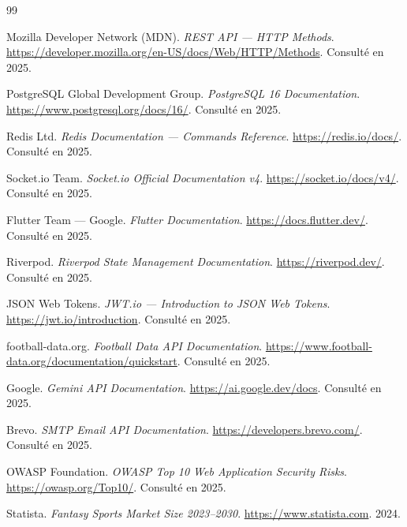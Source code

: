 \begingroup
\makeatletter
\def\chapter*#1{} %
\makeatother
\begin{thebibliography}{99}


Mozilla Developer Network (MDN). \textit{REST API — HTTP Methods}. \url{https://developer.mozilla.org/en-US/docs/Web/HTTP/Methods}. Consulté en 2025.

PostgreSQL Global Development Group. \textit{PostgreSQL 16 Documentation}. \url{https://www.postgresql.org/docs/16/}. Consulté en 2025.

Redis Ltd. \textit{Redis Documentation — Commands Reference}. \url{https://redis.io/docs/}. Consulté en 2025.

Socket.io Team. \textit{Socket.io Official Documentation v4}. \url{https://socket.io/docs/v4/}. Consulté en 2025.

Flutter Team — Google. \textit{Flutter Documentation}. \url{https://docs.flutter.dev/}. Consulté en 2025.

Riverpod. \textit{Riverpod State Management Documentation}. \url{https://riverpod.dev/}. Consulté en 2025.

JSON Web Tokens. \textit{JWT.io — Introduction to JSON Web Tokens}. \url{https://jwt.io/introduction}. Consulté en 2025.

football-data.org. \textit{Football Data API Documentation}. \url{https://www.football-data.org/documentation/quickstart}. Consulté en 2025.

Google. \textit{Gemini API Documentation}. \url{https://ai.google.dev/docs}. Consulté en 2025.

Brevo. \textit{SMTP Email API Documentation}. \url{https://developers.brevo.com/}. Consulté en 2025.

OWASP Foundation. \textit{OWASP Top 10 Web Application Security Risks}. \url{https://owasp.org/Top10/}. Consulté en 2025.

Statista. \textit{Fantasy Sports Market Size 2023--2030}. \url{https://www.statista.com}. 2024.


\end{thebibliography}
